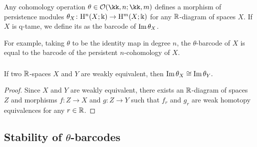 \subsubsection{} \label{subsubsec:theta-barcodes}
Any cohomology operation $\theta \in \cO(\kk,n; \kk,m)$ defines a morphism of persistence modules $\theta_X \colon \mathrm{H}^n(X; \Bbbk) \to \mathrm{H}^m(X; \Bbbk)$ for any $\mathbb{R}$-diagram of spaces $X$.
If $X$ is q-tame, we define its  as the barcode of $\operatorname{Im}\theta_X$.

For example, taking $\theta$ to be the identity map in degree $n$, the $\theta$-barcode of $X$ is equal to the barcode of the persistent $n$-cohomology of $X$.

\subsubsection{}\label{lem:w.h.e. preservance}
\lemma If two $\mathbb{R}$-spaces $X$ and $Y$ are weakly equivalent, then $\operatorname{Im}\theta_{X}\cong\operatorname{Im}\theta_{Y}.$

\begin{proof}
	Since $X$ and $Y$ are weakly equivalent, there exists an $\mathbb{R}$-diagram of spaces $Z$ and morphisms $f \colon Z \to X$ and $g \colon Z \to Y$ such that $f_r$ and $g_r$ are weak homotopy equivalences for any $r \in \mathbb{R}$.
\end{proof}


\subsection{Stability of $\theta$-barcodes}\label{ss:stability}

